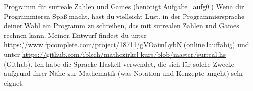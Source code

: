 \documentclass{zirkelblatt}
\begin{document}
\begin{aufgabe}{Programm für surreale Zahlen und Games
(benötigt Aufgabe~\ref{aufg0})}
Wenn dir Programmieren Spaß macht, hast du vielleicht Lust, in der
Programmiersprache deiner Wahl ein Programm zu schreiben, das mit surrealen
Zahlen und Games rechnen kann. Meinen Entwurf findest du unter
\url{https://www.fpcomplete.com/project/18711/gVOaimLybN} (online lauffähig)
und unter
\url{https://github.com/iblech/mathezirkel-kurs/blob/master/surreal.hs}
(Github). Ich habe die Sprache Haskell verwendet, die sich für solche Zwecke
aufgrund ihrer Nähe zur Mathematik (was Notation und Konzepte angeht) sehr
eignet.
\end{aufgabe}


\loesungenfalse
\end{document}

